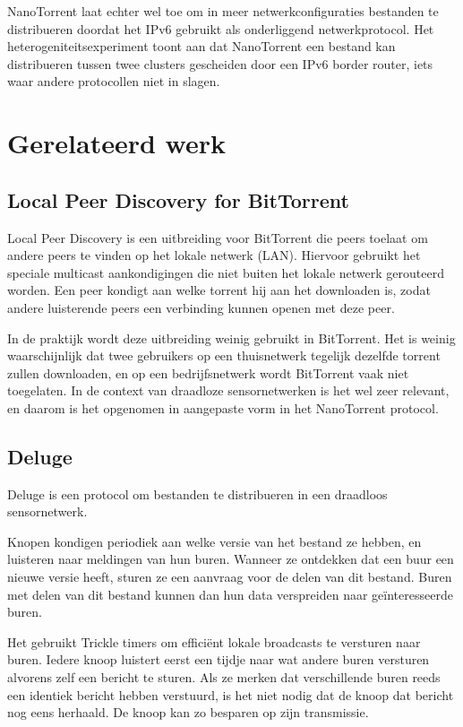 \documentclass[journal]{IEEEtran}
\begin{document}
NanoTorrent laat echter wel toe om in meer netwerkconfiguraties bestanden te distribueren doordat het IPv6 gebruikt als onderliggend netwerkprotocol. Het heterogeniteitsexperiment toont aan dat NanoTorrent een bestand kan distribueren tussen twee clusters gescheiden door een IPv6 border router, iets waar andere protocollen niet in slagen.

\section{Gerelateerd werk}
\label{sec:gerelateerd}

\subsection{Local Peer Discovery for BitTorrent}
Local Peer Discovery \cite{bt-ldp} is een uitbreiding voor BitTorrent die peers toelaat om andere peers te vinden op het lokale netwerk (LAN). Hiervoor gebruikt het speciale multicast aankondigingen die niet buiten het lokale netwerk gerouteerd worden. Een peer kondigt aan welke torrent hij aan het downloaden is, zodat andere luisterende peers een verbinding kunnen openen met deze peer.

In de praktijk wordt deze uitbreiding weinig gebruikt in BitTorrent. Het is weinig waarschijnlijk dat twee gebruikers op een thuisnetwerk tegelijk dezelfde torrent zullen downloaden, en op een bedrijfsnetwerk wordt BitTorrent vaak niet toegelaten. In de context van draadloze sensornetwerken is het wel zeer relevant, en daarom is het opgenomen in aangepaste vorm in het NanoTorrent protocol.

\subsection{Deluge}
Deluge \cite{deluge} is een protocol om bestanden te distribueren in een draadloos sensornetwerk.

Knopen kondigen periodiek aan welke versie van het bestand ze hebben, en luisteren naar meldingen van hun buren. Wanneer ze ontdekken dat een buur een nieuwe versie heeft, sturen ze een aanvraag voor de delen van dit bestand. Buren met delen van dit bestand kunnen dan hun data verspreiden naar ge\"interesseerde buren.

Het gebruikt Trickle timers \cite{trickle} om effici\"ent lokale broadcasts te versturen naar buren. Iedere knoop luistert eerst een tijdje naar wat andere buren versturen alvorens zelf een bericht te sturen. Als ze merken dat verschillende buren reeds een identiek bericht hebben verstuurd, is het niet nodig dat de knoop dat bericht nog eens herhaald. De knoop kan zo besparen op zijn transmissie.
\end{document}
